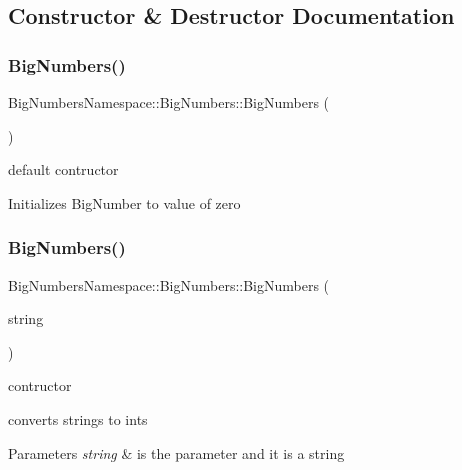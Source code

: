 \subsection{Constructor \& Destructor Documentation}
\mbox{\label{class_big_numbers_namespace_1_1_big_numbers_a5bfa6f3a7f04d3c7b3ace2105c1c1ffb}} 
\subsubsection{\texorpdfstring{BigNumbers()}{BigNumbers()}\hspace{0.1cm}{\footnotesize\ttfamily [1/2]}}
{\footnotesize\ttfamily Big\+Numbers\+Namespace\+::\+Big\+Numbers\+::\+Big\+Numbers (\begin{DoxyParamCaption}{ }\end{DoxyParamCaption})\hspace{0.3cm}{\ttfamily [private]}}



default contructor 

Initializes Big\+Number to value of zero \mbox{\label{class_big_numbers_namespace_1_1_big_numbers_a8bf0b6aa84bc1d96eab66887fbbee957}} 
\subsubsection{\texorpdfstring{BigNumbers()}{BigNumbers()}\hspace{0.1cm}{\footnotesize\ttfamily [2/2]}}
{\footnotesize\ttfamily Big\+Numbers\+Namespace\+::\+Big\+Numbers\+::\+Big\+Numbers (\begin{DoxyParamCaption}\item[{std\+::string}]{string }\end{DoxyParamCaption})\hspace{0.3cm}{\ttfamily [private]}}



contructor 

converts strings to ints 
\begin{DoxyParams}{Parameters}
{\em string} & is the parameter and it is a string \\
\hline
\end{DoxyParams}


